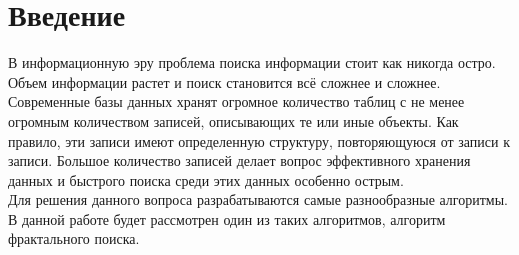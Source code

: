 \section*{Введение}

В информационную эру проблема поиска информации стоит как никогда остро. Объем информации растет и поиск становится всё сложнее и сложнее. Современные базы данных хранят огромное количество таблиц с не менее огромным количеством записей, описывающих те или иные объекты. Как правило, эти записи имеют определенную структуру, повторяющуюся от записи к записи. Большое количество записей делает вопрос эффективного хранения данных и быстрого поиска среди этих данных особенно острым. 
\\

Для решения данного вопроса разрабатываются самые разнообразные алгоритмы. В данной работе будет рассмотрен один из таких алгоритмов, алгоритм фрактального поиска.